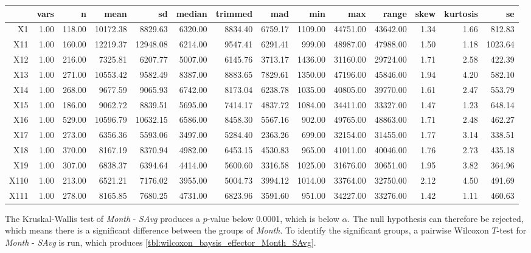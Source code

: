 \begin{tabular}{rrrrrrrrrrrrrr}
  \hline
 & vars & n & mean & sd & median & trimmed & mad & min & max & range & skew & kurtosis & se \\ 
  \hline
X1 & 1.00 & 118.00 & 10172.38 & 8829.63 & 6320.00 & 8834.40 & 6759.17 & 1109.00 & 44751.00 & 43642.00 & 1.34 & 1.66 & 812.83 \\ 
  X11 & 1.00 & 160.00 & 12219.37 & 12948.08 & 6214.00 & 9547.41 & 6291.41 & 999.00 & 48987.00 & 47988.00 & 1.50 & 1.18 & 1023.64 \\ 
  X12 & 1.00 & 216.00 & 7325.81 & 6207.77 & 5007.00 & 6145.76 & 3713.17 & 1436.00 & 31160.00 & 29724.00 & 1.71 & 2.58 & 422.39 \\ 
  X13 & 1.00 & 271.00 & 10553.42 & 9582.49 & 8387.00 & 8883.65 & 7829.61 & 1350.00 & 47196.00 & 45846.00 & 1.94 & 4.20 & 582.10 \\ 
  X14 & 1.00 & 268.00 & 9677.59 & 9065.93 & 6742.00 & 8173.04 & 6238.78 & 1035.00 & 40805.00 & 39770.00 & 1.61 & 2.47 & 553.79 \\ 
  X15 & 1.00 & 186.00 & 9062.72 & 8839.51 & 5695.00 & 7414.17 & 4837.72 & 1084.00 & 34411.00 & 33327.00 & 1.47 & 1.23 & 648.14 \\ 
  X16 & 1.00 & 529.00 & 10596.79 & 10632.15 & 6586.00 & 8458.30 & 5567.16 & 902.00 & 49765.00 & 48863.00 & 1.71 & 2.48 & 462.27 \\ 
  X17 & 1.00 & 273.00 & 6356.36 & 5593.06 & 3497.00 & 5284.40 & 2363.26 & 699.00 & 32154.00 & 31455.00 & 1.77 & 3.14 & 338.51 \\ 
  X18 & 1.00 & 370.00 & 8167.19 & 8370.94 & 4982.00 & 6453.15 & 4530.83 & 965.00 & 41011.00 & 40046.00 & 1.76 & 2.73 & 435.18 \\ 
  X19 & 1.00 & 307.00 & 6838.37 & 6394.64 & 4414.00 & 5600.60 & 3316.58 & 1025.00 & 31676.00 & 30651.00 & 1.95 & 3.82 & 364.96 \\ 
  X110 & 1.00 & 213.00 & 6521.21 & 7176.02 & 3955.00 & 5004.73 & 3994.12 & 1014.00 & 33764.00 & 32750.00 & 2.12 & 4.50 & 491.69 \\ 
  X111 & 1.00 & 278.00 & 8165.85 & 7680.25 & 4731.00 & 6823.96 & 3591.60 & 951.00 & 34227.00 & 33276.00 & 1.42 & 1.11 & 460.63 \\ 
   \hline
\end{tabular}

The Kruskal-Wallis test of \textit{Month} - \textit{SAvg} produces a $p$-value below 0.0001, which is below $\alpha$. The null hypothesis can therefore be rejected, which means there is a significant difference between the groups of \textit{Month}. To identify the significant groups, a pairwise Wilcoxon $T$-test for \textit{Month} - \textit{SAvg} is run, which produces \cref{tbl:wilcoxon_baysis_effector_Month_SAvg}. 

